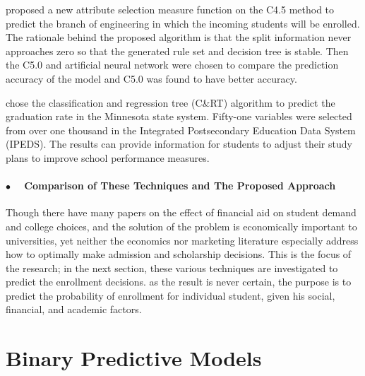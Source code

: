 \documentclass[12pt,english]{report}
\begin{document}
\citet{dt_enroll_india} proposed a new attribute selection measure function on
the C4.5 method to predict the branch of engineering in which the incoming
students will be enrolled. The rationale behind the proposed algorithm is that
the split information never approaches zero so that the generated rule set and
decision tree is stable. Then the C5.0 and artificial neural network were
chosen to compare the prediction accuracy of the model and C5.0 was found to
have better accuracy.


\citet{Bailey2006} chose the classification and regression tree (C\&RT)
algorithm to predict the graduation rate in the Minnesota state system.
Fifty-one variables were selected from over one thousand in the Integrated
Postsecondary Education Data System (IPEDS). The results can provide
information for students to adjust their study plans to improve school
performance measures.


\subsubsection {$\bullet \quad$ Comparison of These Techniques and The Proposed
Approach}

\vspace{0.25in}
Though there have many papers on the effect of financial aid on student demand
and college choices, and the solution of the problem is economically important
to universities, yet neither the economics nor marketing literature especially
address how to optimally make admission and scholarship decisions.  This is the
focus of the research; in the next section, these various techniques are
investigated to predict the enrollment decisions.  as the result is never
certain, the purpose is to predict the probability of enrollment for individual
student, given his social, financial, and academic factors.

\chapter{Binary Predictive Models } %
\end{document}
